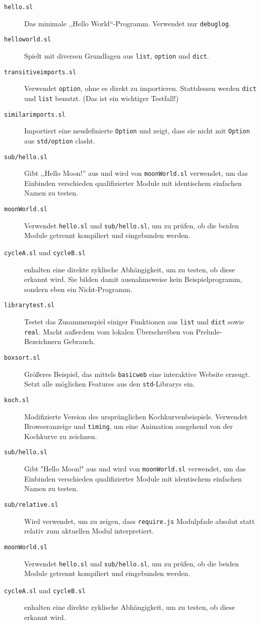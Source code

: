 \documentclass[runningheads]{llncs}
\begin{document}
\begin{description}
 \item[\texttt{hello.sl}] Das minimale ,,Hello World``-Programm. Verwendet
   nur \verb|debuglog|.
 \item[\texttt{helloworld.sl}] Spielt mit diversen Grundlagen aus \verb|list|,
   \verb|option| und \verb|dict|.
 \item[\texttt{transitiveimports.sl}] Verwendet \verb|option|, ohne es direkt
   zu importieren. Stattdessen werden \verb|dict| und \verb|list| benutzt.
   (Das ist ein wichtiger Testfall!)
 \item[\texttt{similarimports.sl}] Importiert eine neudefinierte \verb|Option|
   und zeigt, dass sie nicht mit \verb|Option| aus \verb|std/option| clasht.
 \item[\texttt{sub/hello.sl}] Gibt ,,Hello Moon!'' aus und wird von
   \texttt{moonWorld.sl} verwendet, um das Einbinden verschieden
   qualifizierter Module mit identischem einfachen Namen zu testen.
 \item[\texttt{moonWorld.sl}] Verwendet \texttt{hello.sl} und
   \texttt{sub/hello.sl}, um zu prüfen, ob die beiden Module getrennt
   kompiliert und eingebunden werden.
 \item[\texttt{cycleA.sl} \textnormal{und} \texttt{cycleB.sl}] enhalten eine
   direkte zyklische Abhängigkeit, um zu testen, ob diese erkannt wird. Sie
   bilden damit ausnahmsweise kein Beispielprogramm, sondern eben ein 
   Nicht-Programm.
 \item[\texttt{librarytest.sl}] Testet das Zusammenspiel einiger Funktionen aus
   \verb|list| und \verb|dict| sowie \verb|real|. Macht außerdem vom lokalen
   Überschreiben von Prelude-Bezeichnern Gebrauch.
 \item[\texttt{boxsort.sl}] Größeres Beispiel, das mittels \verb|basicweb| eine
   interaktive Website erzeugt. Setzt alle möglichen Features aus den
   \verb|std|-Librarys ein.
 \item[\texttt{koch.sl}] Modifizierte Version des ursprünglichen
   Kochkurvenbeispiels. Verwendet Browseranzeige und \verb|timing|, um eine
   Animation ausgehend von der Kochkurve zu zeichnen.
 \item[\texttt{sub/hello.sl}] Gibt "Hello Moon!" aus und wird von
   \texttt{moonWorld.sl} verwendet, um das Einbinden verschieden
   qualifizierter Module mit identischem einfachen Namen zu testen.
 \item[\texttt{sub/relative.sl}] Wird verwendet, um zu zeigen, dass
    \texttt{require.js} Modulpfade absolut statt relativ zum aktuellen
    Modul interpretiert.
 \item[\texttt{moonWorld.sl}] Verwendet \texttt{hello.sl} und
   \texttt{sub/hello.sl}, um zu prüfen, ob die beiden Module getrennt
   kompiliert und eingebunden werden.
 \item[\texttt{cycleA.sl} \textnormal{und} \texttt{cycleB.sl}] enhalten eine direkte
   zyklische Abhängigkeit, um zu testen, ob diese erkannt wird.
\end{description}
\end{document}
